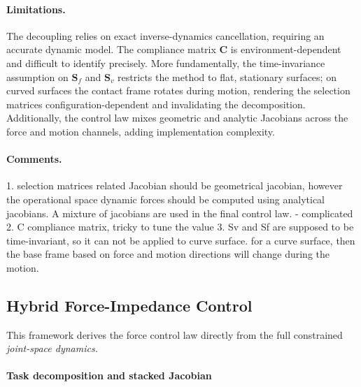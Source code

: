 \documentclass[
	german,%
	accentcolor=9c,%
	ruledheaders=section,%
	class=report,%
	thesis={type=bachelor},%
	fontsize=11pt,%
	parskip=half-,%
	custommargins=true,%
	marginpar=false,%
]{tudapub}
\begin{document}
\paragraph{Limitations.}
The decoupling relies on exact inverse-dynamics cancellation, requiring an
accurate dynamic model. The compliance matrix $\mathbf{C}$ is environment-dependent
and difficult to identify precisely. More fundamentally, the time-invariance
assumption on $\mathbf{S}_f$ and $\mathbf{S}_v$ restricts the method to flat,
stationary surfaces; on curved surfaces the contact frame rotates during motion,
rendering the selection matrices configuration-dependent and invalidating the
decomposition. Additionally, the control law mixes geometric and analytic
Jacobians across the force and motion channels, adding implementation complexity.

\paragraph{Comments.}
1. selection matrices related Jacobian should be geometrical jacobian, however the operational space dynamic forces should be computed using analytical jacobians. A mixture of jacobians are used in the final control law. - complicated
2. C compliance matrix, tricky to tune the value
3. Sv and Sf are supposed to be time-invariant, so it can not be applied to curve surface. for a curve surface, then the base frame based on force and motion directions will change during the motion.  

\subsection{Hybrid Force-Impedance Control}
\label{sec:hybrid_force_impedance}

This framework derives the force control law directly from the full constrained \emph{joint-space
dynamics.}

\paragraph{Task decomposition and stacked Jacobian}
\end{document}
